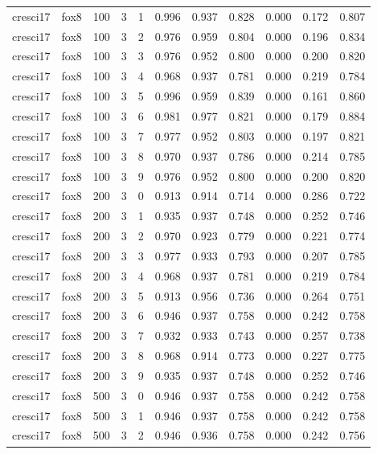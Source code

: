 \begin{tabular}{llrrrrrrrrr}
cresci17 & fox8 & 100 & 3 & 1 & 0.996 & 0.937 & 0.828 & 0.000 & 0.172 & 0.807 \\
cresci17 & fox8 & 100 & 3 & 2 & 0.976 & 0.959 & 0.804 & 0.000 & 0.196 & 0.834 \\
cresci17 & fox8 & 100 & 3 & 3 & 0.976 & 0.952 & 0.800 & 0.000 & 0.200 & 0.820 \\
cresci17 & fox8 & 100 & 3 & 4 & 0.968 & 0.937 & 0.781 & 0.000 & 0.219 & 0.784 \\
cresci17 & fox8 & 100 & 3 & 5 & 0.996 & 0.959 & 0.839 & 0.000 & 0.161 & 0.860 \\
cresci17 & fox8 & 100 & 3 & 6 & 0.981 & 0.977 & 0.821 & 0.000 & 0.179 & 0.884 \\
cresci17 & fox8 & 100 & 3 & 7 & 0.977 & 0.952 & 0.803 & 0.000 & 0.197 & 0.821 \\
cresci17 & fox8 & 100 & 3 & 8 & 0.970 & 0.937 & 0.786 & 0.000 & 0.214 & 0.785 \\
cresci17 & fox8 & 100 & 3 & 9 & 0.976 & 0.952 & 0.800 & 0.000 & 0.200 & 0.820 \\
cresci17 & fox8 & 200 & 3 & 0 & 0.913 & 0.914 & 0.714 & 0.000 & 0.286 & 0.722 \\
cresci17 & fox8 & 200 & 3 & 1 & 0.935 & 0.937 & 0.748 & 0.000 & 0.252 & 0.746 \\
cresci17 & fox8 & 200 & 3 & 2 & 0.970 & 0.923 & 0.779 & 0.000 & 0.221 & 0.774 \\
cresci17 & fox8 & 200 & 3 & 3 & 0.977 & 0.933 & 0.793 & 0.000 & 0.207 & 0.785 \\
cresci17 & fox8 & 200 & 3 & 4 & 0.968 & 0.937 & 0.781 & 0.000 & 0.219 & 0.784 \\
cresci17 & fox8 & 200 & 3 & 5 & 0.913 & 0.956 & 0.736 & 0.000 & 0.264 & 0.751 \\
cresci17 & fox8 & 200 & 3 & 6 & 0.946 & 0.937 & 0.758 & 0.000 & 0.242 & 0.758 \\
cresci17 & fox8 & 200 & 3 & 7 & 0.932 & 0.933 & 0.743 & 0.000 & 0.257 & 0.738 \\
cresci17 & fox8 & 200 & 3 & 8 & 0.968 & 0.914 & 0.773 & 0.000 & 0.227 & 0.775 \\
cresci17 & fox8 & 200 & 3 & 9 & 0.935 & 0.937 & 0.748 & 0.000 & 0.252 & 0.746 \\
cresci17 & fox8 & 500 & 3 & 0 & 0.946 & 0.937 & 0.758 & 0.000 & 0.242 & 0.758 \\
cresci17 & fox8 & 500 & 3 & 1 & 0.946 & 0.937 & 0.758 & 0.000 & 0.242 & 0.758 \\
cresci17 & fox8 & 500 & 3 & 2 & 0.946 & 0.936 & 0.758 & 0.000 & 0.242 & 0.756 \\

\end{tabular}
